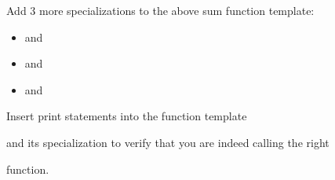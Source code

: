 Add 3 more specializations to the above sum function template:



\begin{itemize}

\item {} and 

\item {} and 

\item {} and 

\end{itemize}



Insert print statements into the  function template

and its specialization to verify that you are indeed calling the right

function.

